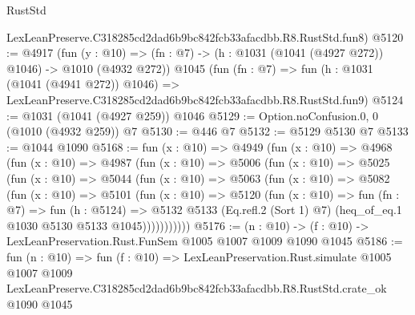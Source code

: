 \begin{lexlean}{RustStd}
\begin{coremodule}
    LexLeanPreserve.C318285cd2dad6b9bc842fcb33afacdbb.R8.RustStd.fun8)
@5120 := @4917
    (fun (y : @10) => (fn : @7) -> (h : @1031 (@1041 (@4927 @272)) @1046) -> @1010 (@4932 @272))
    @1045
    (fun (fn : @7) =>
    fun (h : @1031 (@1041 (@4941 @272)) @1046) =>
    LexLeanPreserve.C318285cd2dad6b9bc842fcb33afacdbb.R8.RustStd.fun9)
@5124 := @1031 (@1041 (@4927 @259)) @1046
@5129 := Option.noConfusion.{0, 0} (@1010 (@4932 @259)) @7
@5130 := @446 @7
@5132 := @5129 @5130 @7
@5133 := @1044 @1090
@5168 := fun (x : @10) =>
  @4949
    (fun (x : @10) =>
    @4968
      (fun (x : @10) =>
      @4987
        (fun (x : @10) =>
        @5006
          (fun (x : @10) =>
          @5025
            (fun (x : @10) =>
            @5044
              (fun (x : @10) =>
              @5063
                (fun (x : @10) =>
                @5082
                  (fun (x : @10) =>
                  @5101
                    (fun (x : @10) =>
                    @5120
                      (fun (x : @10) =>
                      fun (fn : @7) =>
                      fun (h : @5124) =>
                      @5132
                        @5133
                        (Eq.refl.{2} (Sort 1) @7)
                        (heq_of_eq.{1} @1030 @5130 @5133 @1045)))))))))))
@5176 := (n : @10) -> (f : @10) -> LexLeanPreservation.Rust.FunSem @1005 @1007 @1009 @1090 @1045
@5186 := fun (n : @10) =>
  fun (f : @10) =>
  LexLeanPreservation.Rust.simulate
    @1005
    @1007
    @1009
    LexLeanPreserve.C318285cd2dad6b9bc842fcb33afacdbb.R8.RustStd.crate_ok
    @1090
    @1045
\end{coremodule}
\end{lexlean}
